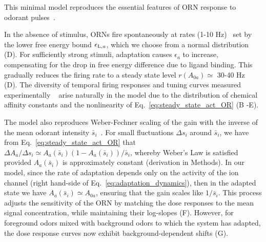 \documentclass[9pt,lineno]{elife}
\begin{document}
This minimal model reproduces the essential features of ORN response to odorant pulses~\citep{nagel_wilson_biophysical, martelli, cao_WL}. {\color{blue} In the absence of stimulus, ORNs fire spontaneously at rates (1-10 Hz)~\citep{hallem_carlson} set by the lower free energy bound $\epsilon_{\textup{L}, a}$, which we choose from a normal distribution (D). For sufficiently strong stimuli, adaptation causes $\epsilon_a$ to increase, compensating for the drop in free energy difference due to ligand binding. This gradually reduces the firing rate to a steady state level $r(A_{0a}) \simeq$ 30-40 Hz~\citep{srinivas_elife}  (D). The diversity of temporal firing responses and tuning curves measured experimentally ~\citep{hallem_carlson,montague2011similar, stopfer_nat_neuro, stopfer_temporal_channel,stopfer_temporal_model} arise naturally in the model due to the distribution of chemical affinity constants and the nonlinearity of Eq.~\ref{eq:steady_state_act_OR} (B -E). 

The model also reproduces Weber-Fechner scaling of the gain with the inverse of the mean odorant intensity $\bar{s}_i$~\citep{srinivas_elife, cao_WL}. For small fluctuations $\Delta s_i$ around $\bar{s}_i$, we have from Eq.~\ref{eq:steady_state_act_OR} that $\Delta A_a/\Delta s_i\simeq A_a\left(\bar{s}_i\right)\left(1-A_a\left(\bar{s}_i\right)\right)/\bar{s}_i$, whereby Weber's Law is satisfied provided $A_a(\bar{s}_i)$ is approximately constant (derivation in Methods). In our model, since the rate of adaptation depends only on the activity of the ion channel (right hand-side of Eq.~\ref{eq:adaptation_dynamics}), then in the adapted state we have $A_a\left(\bar{s}_i\right)\simeq A_{0a}$, ensuring that the gain scales like $1/\bar{s}_i$. This process adjusts the sensitivity of the ORN by matching the dose responses to the mean signal concentration, while maintaining their log-slopes (F). However, for foreground odors mixed with background odors to which the system has adapted, the dose response curves now exhibit background-dependent shifts (G). }




\end{document}
